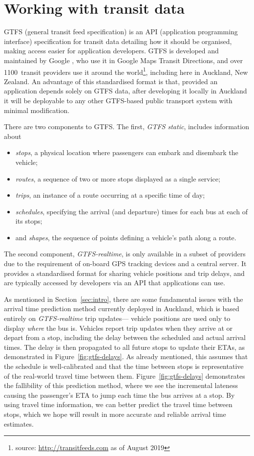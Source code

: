 \section{Working with \rt transit data}
\label{sec:gtfs}


GTFS (general transit feed specification)
is an API (application programming interface) specification for transit data
detailing how it should be organised,
making access easier for application developers.
GTFS is developed and maintained by Google \citep{GoogleDevelopers_2006},
who use it in Google Maps Transit Directions,
and over 1100~transit providers use it around the world\footnote{%
source: \url{http://transitfeeds.com} as of August 2019},
including here in Auckland, New Zealand.
An advantage of this standardised format is that,
provided an application depends solely on GTFS data,
after developing it locally in Auckland it will be deployable to any other GTFS-based
public transport system with minimal modification.


There are two components to GTFS.
The first, \emph{GTFS static}, includes information about
\begin{itemize}
\item \emph{stops}, a physical location where passengers can embark and disembark the vehicle;
\item \emph{routes}, a sequence of two or more stops displayed as a single service;
\item \emph{trips}, an instance of a route occurring at a specific time of day;
\item \emph{schedules}, specifying the arrival (and departure) times for each bus at each of its stops; 
\item and \emph{shapes}, the sequence of points defining a vehicle's path along a route.
\end{itemize}
The second component, \emph{GTFS-realtime},
is only available in a subset of providers due to the requirement of 
on-board GPS tracking devices and a central server.
It provides a standardised format for sharing vehicle positions and trip delays,
and are typically accessed by developers via an API that \rt applications can use.

As mentioned in Section~\ref{sec:intro},
there are some fundamental issues with the arrival time prediction method currently
deployed in Auckland,
which is based entirely on \emph{GTFS-realtime} trip updates---%
vehicle positions are used only to display \emph{where} the bus is.
Vehicles report trip updates when they arrive at or depart from a stop,
including the delay between the scheduled and actual arrival times.
The delay is then propagated to all future stops to update their ETAs,
as demonstrated in Figure~\ref{fig:gtfs-delays}.
As already mentioned, this assumes that the schedule is well-calibrated
and that the time between stops
is representative of the real-world travel time between them. 
Figure~\ref{fig:gtfs-delays} demonstrates the fallibility of this prediction method,
where we see the incremental lateness causing the passenger's ETA to 
jump each time the bus arrives at a stop.
By using \rt travel time information,
we can better predict the travel time between stops,
which we hope will result in more accurate and reliable arrival time estimates.


